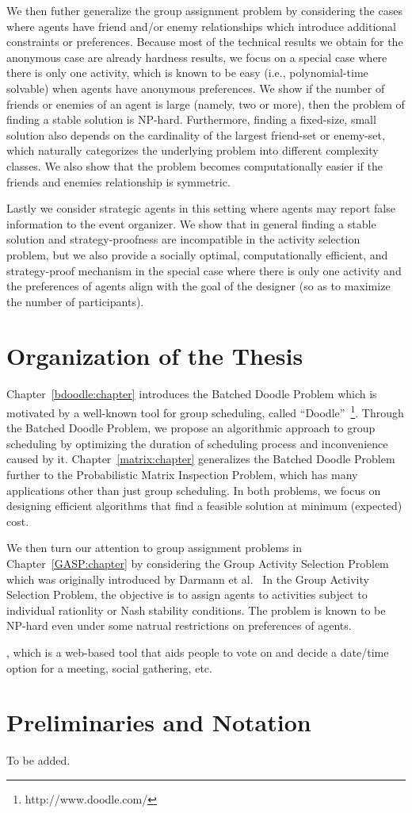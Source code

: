 We then futher generalize the group assignment problem by considering the cases where agents have friend and/or enemy relationships which introduce additional constraints or preferences. Because most of the technical results we obtain for the anonymous case are already hardness results, we focus on a special case where there is only one activity, which is known to be easy (i.e., polynomial-time solvable) when agents have anonymous preferences. We show if the number of friends or enemies of an agent is large (namely, two or more), then the problem of finding a stable solution is NP-hard. Furthermore, finding a fixed-size, small solution also depends on the cardinality of the largest friend-set or enemy-set, which naturally categorizes the underlying problem into different complexity classes. We also show that the problem becomes computationally easier if the friends and enemies relationship is symmetric.

Lastly we consider strategic agents in this setting where agents may report false information to the event organizer. We show that in general finding a stable solution and strategy-proofness are incompatible in the activity selection problem, but we also provide a socially optimal, computationally efficient, and strategy-proof mechanism in the special case where there is only one activity and the preferences of agents align with the goal of the designer (so as to maximize the number of participants).


\section{Organization of the Thesis}
Chapter~\ref{bdoodle:chapter} introduces the Batched Doodle Problem which is motivated by a well-known tool for group scheduling, called ``Doodle''~\footnote{http://www.doodle.com/}. Through the Batched Doodle Problem, we propose an algorithmic approach to group scheduling by optimizing the duration of scheduling process and inconvenience caused by it. Chapter~\ref{matrix:chapter} generalizes the Batched Doodle Problem further to the Probabilistic Matrix Inspection Problem, which has many applications other than just group scheduling. In both problems, we focus on designing efficient algorithms that find a feasible solution at minimum (expected) cost. 

We then turn our attention to group assignment problems in Chapter~\ref{GASP:chapter} by considering the Group Activity Selection Problem which was originally introduced by Darmann et al.~\cite{GASP12WINE} In the Group Activity Selection Problem, the objective is to assign agents to activities subject to individual rationlity or Nash stability conditions. The problem is known to be NP-hard even under some natrual restrictions on preferences of agents. 


, which is a web-based tool that aids people to vote on and decide a date/time option for a meeting, social gathering, etc. 

\section{Preliminaries and Notation}

To be added.

